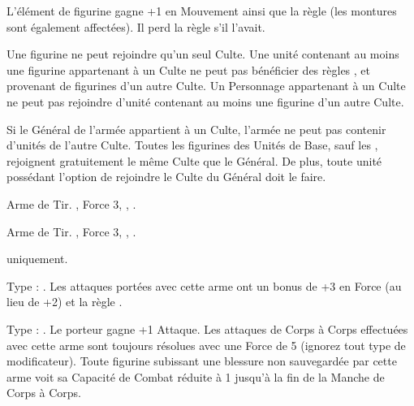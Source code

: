 \begin{multicols}{2}
\begin{center}
L'élément de figurine gagne +1 en Mouvement ainsi que la règle \strider{} (les montures sont également affectées). Il perd la règle \killerinstinct{} s'il l'avait.
\end{center}
\end{multicols}

\armyspecialruleentry{\cultrivalry}

Une figurine ne peut rejoindre qu'un seul Culte. Une unité contenant au moins une figurine appartenant à un Culte ne peut pas bénéficier des règles \holdyourground{}, \inspiringpresence{} et \divineblessings{} provenant de figurines d'un autre Culte. Un Personnage appartenant à un Culte ne peut pas rejoindre d'unité contenant au moins une figurine d'un autre Culte.

\armyspecialruleentry{\cultistgeneral}

Si le Général de l'armée appartient à un Culte, l'armée ne peut pas contenir d'unités de l'autre Culte. Toutes les figurines des Unités de Base, sauf les \bladesofnabh{}, rejoignent gratuitement le même Culte que le Général. De plus, toute unité possédant l'option de rejoindre le Culte du Général doit le faire.

\closearmynewsection




\vspace*{1.5cm}
\startarmyarmoury

\startitemlistonecol

\listitemonecol{\repeatercrossbow} Arme de Tir. , Force 3, , .

\listitemonecol{\repeaterhandbow} Arme de Tir. , Force 3, , \quicktofire{}.

\enditemlistonecol

\closearmyarmoury





\startarmymagicalitems

\armymagicalweapons

\startpricelist

\infantry{} uniquement.

Type : \gw{}. Les attaques portées avec cette arme ont un bonus de +3 en Force (au lieu de +2) et la règle .

Type : \hw{}. Le porteur gagne +1 Attaque. Les attaques de Corps à Corps effectuées avec cette arme sont toujours résolues avec une Force de 5 (ignorez tout type de modificateur). Toute figurine subissant une blessure non sauvegardée par cette arme voit sa Capacité de Combat réduite à 1 jusqu'à la fin de la Manche de Corps à Corps.

